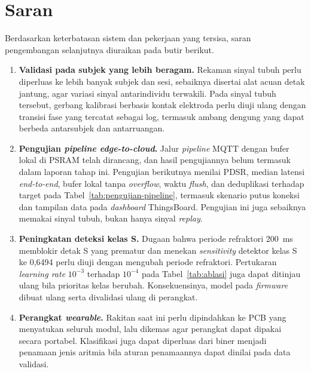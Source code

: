 \section{Saran}

Berdasarkan keterbatasan sistem dan pekerjaan yang tersisa, saran pengembangan selanjutnya diuraikan pada butir berikut.
\begin{enumerate}
  \item \textbf{Validasi pada subjek yang lebih beragam.} Rekaman sinyal tubuh perlu diperluas ke lebih banyak subjek dan sesi, sebaiknya disertai alat acuan detak jantung, agar variasi sinyal antarindividu terwakili. Pada sinyal tubuh tersebut, gerbang kalibrasi berbasis kontak elektroda perlu diuji ulang dengan transisi fase yang tercatat sebagai log, termasuk ambang dengung yang dapat berbeda antarsubjek dan antarruangan.
  \item \textbf{Pengujian \textit{pipeline edge-to-cloud}.} Jalur \textit{pipeline} MQTT dengan bufer lokal di PSRAM telah dirancang, dan hasil pengujiannya belum termasuk dalam laporan tahap ini. Pengujian berikutnya menilai PDSR, median latensi \textit{end-to-end}, bufer lokal tanpa \textit{overflow}, waktu \textit{flush}, dan deduplikasi terhadap target pada Tabel~\ref{tab:pengujian-pipeline}, termasuk skenario putus koneksi dan tampilan data pada \textit{dashboard} ThingsBoard. Pengujian ini juga sebaiknya memakai sinyal tubuh, bukan hanya sinyal \textit{replay}.
  \item \textbf{Peningkatan deteksi kelas S.} Dugaan bahwa periode refraktori 200~ms memblokir detak S yang prematur dan menekan \textit{sensitivity} detektor kelas S ke 0,6494 perlu diuji dengan mengubah periode refraktori. Pertukaran \textit{learning rate} $10^{-3}$ terhadap $10^{-4}$ pada Tabel~\ref{tab:ablasi} juga dapat ditinjau ulang bila prioritas kelas berubah. Konsekuensinya, model pada \textit{firmware} dibuat ulang serta divalidasi ulang di perangkat.
  \item \textbf{Perangkat \textit{wearable}.} Rakitan saat ini perlu dipindahkan ke PCB yang menyatukan seluruh modul, lalu dikemas agar perangkat dapat dipakai secara portabel. Klasifikasi juga dapat diperluas dari biner menjadi penamaan jenis aritmia bila aturan penamaannya dapat dinilai pada data validasi.
\end{enumerate}
